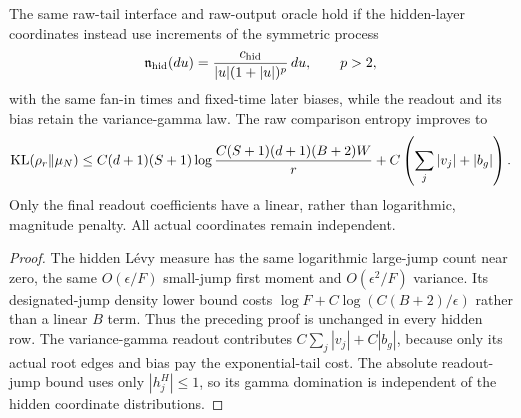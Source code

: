 \begin{corollary}
\label{cor:VG-mixed-hidden}
The same raw-tail interface and raw-output oracle hold if the hidden-layer coordinates instead use increments of the symmetric process
\[
 \mathfrak n_{\rm hid}(du)
 =\frac{c_{\rm hid}}{|u|(1+|u|)^p}\,du,\qquad p>2,
\]
with the same fan-in times and fixed-time later biases, while the readout and its bias retain the variance-gamma law. The raw comparison entropy improves to
\[
 \operatorname{KL}(\rho_r\|\mu_N)
 \le C(d+1)(S+1)
       \log\frac{C(S+1)(d+1)(B+2)W}{r}
       +C\left(\sum_j|v_j|+|b_g|\right).
\]
Only the final readout coefficients have a linear, rather than logarithmic, magnitude penalty. All actual coordinates remain independent.
\end{corollary}
\begin{proof}
The hidden Lévy measure has the same logarithmic large-jump count near zero, the same $O(\epsilon/F)$ small-jump first moment and $O(\epsilon^2/F)$ variance. Its designated-jump density lower bound costs
$\log F+C\log(C(B+2)/\epsilon)$ rather than a linear $B$ term. Thus the preceding proof is unchanged in every hidden row. The variance-gamma readout contributes
$C\sum_j|v_j|+C|b_g|$, because only its actual root edges and bias pay the exponential-tail cost. The absolute readout-jump bound uses only $|h_j^H|\le1$, so its gamma domination is independent of the hidden coordinate distributions.
\end{proof}
